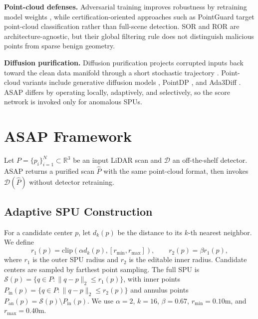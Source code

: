 \documentclass[conference]{IEEEtran}
\begin{document}
\textbf{Point-cloud defenses.} Adversarial training improves robustness by retraining model weights \cite{liu2019extending,sun2020towards}, while certification-oriented approaches such as PointGuard \cite{liu2021pointguard} target point-cloud classification rather than full-scene detection. SOR and ROR \cite{rusu2008towards} are architecture-agnostic, but their global filtering rule does not distinguish malicious points from sparse benign geometry.

\textbf{Diffusion purification.} Diffusion purification projects corrupted inputs back toward the clean data manifold through a short stochastic trajectory \cite{nie2022diffpure,song2021scorebased}. Point-cloud variants include generative diffusion models \cite{luo2021diffusion}, PointDP \cite{sun2023pointdp}, and Ada3Diff \cite{zhang2023ada3diff}. ASAP differs by operating locally, adaptively, and selectively, so the score network is invoked only for anomalous SPUs.

\section{ASAP Framework}

Let $P=\{p_i\}_{i=1}^{N}\subset\mathbb{R}^3$ be an input LiDAR scan and $\mathcal{D}$ an off-the-shelf detector. ASAP returns a purified scan $\hat P$ with the same point-cloud format, then invokes $\mathcal{D}(\hat P)$ without detector retraining.



\subsection{Adaptive SPU Construction}

For a candidate center $p$, let $d_k(p)$ be the distance to its $k$-th nearest neighbor. We define
\begin{equation}
r_1(p)=\mathrm{clip}\!\left(\alpha d_k(p),[r_{\min},r_{\max}]\right),\qquad
r_2(p)=\beta r_1(p),
\end{equation}
where $r_1$ is the outer SPU radius and $r_2$ is the editable inner radius. Candidate centers are sampled by farthest point sampling. The full SPU is $\mathcal{S}(p)=\{q\in P:\|q-p\|_2\le r_1(p)\}$, with inner points $P_{\mathrm{in}}(p)=\{q\in P:\|q-p\|_2\le r_2(p)\}$ and annulus points $P_{\mathrm{an}}(p)=\mathcal{S}(p)\setminus P_{\mathrm{in}}(p)$. We use $\alpha=2$, $k=16$, $\beta=0.67$, $r_{\min}=0.10$m, and $r_{\max}=0.40$m.
\end{document}
